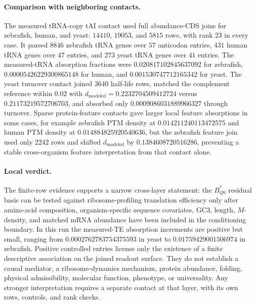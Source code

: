 \paragraph{Comparison with neighboring contacts.}
The measured tRNA-copy tAI contact used full abundance-CDS joins for zebrafish, human, and yeast: $14410$, $19053$, and $5815$ rows, with rank $23$ in every case.  It parsed $8846$ zebrafish tRNA genes over $57$ anticodon entries, $431$ human tRNA genes over $47$ entries, and $273$ yeast tRNA genes over $41$ entries.  The measured-tRNA absorption fractions were $0.020817102845637092$ for zebrafish, $0.00005426229300865148$ for human, and $0.001530747712165342$ for yeast.  The yeast turnover contact joined $3640$ half-life rows, matched the complement reference within $0.02$ with $d_{\mathrm{modeled}}=0.2232704509412724$ versus $0.21173219572706703$, and absorbed only $0.0009086031889966327$ through turnover.  Sparse protein-feature contacts gave larger local feature absorptions in some cases, for example zebrafish PTM density at $0.014211240113472575$ and human PTM density at $0.014884825920540636$, but the zebrafish feature join used only $2242$ rows and shifted $d_{\mathrm{modeled}}$ by $0.1384608720516286$, preventing a stable cross-organism feature interpretation from that contact alone.

\paragraph{Local verdict.}
The finite-row evidence supports a narrow cross-layer statement: the $B^{\ast}_{Q6}$ residual basis can be tested against ribosome-profiling translation efficiency only after amino-acid composition, organism-specific sequence covariates, GC3, length, $M$-density, and matched mRNA abundance have been included in the conditioning boundary.  In this run the measured-TE absorption increments are positive but small, ranging from $0.0002762783754375593$ in yeast to $0.01759429001506974$ in zebrafish.  Positive controlled entries license only the existence of a finite descriptive association on the joined readout surface.  They do not establish a causal mediator, a ribosome-dynamics mechanism, protein abundance, folding, physical admissibility, molecular function, phenotype, or universality.  Any stronger interpretation requires a separate contact at that layer, with its own rows, controls, and rank checks.
